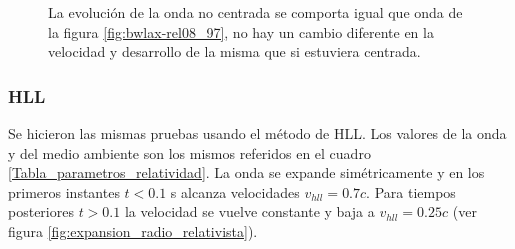 \documentclass[12pt,a4paper]{book}
\begin{document}
\begin{figure}
\caption{\label{fig:bwlaxnc-rel00_65}La evolución de la onda no centrada se comporta igual que onda de la figura \ref{fig:bwlax-rel08_97}, no hay un cambio diferente en la velocidad y desarrollo de la misma que si estuviera centrada.} 
\end{figure}



\subsubsection{HLL}


Se hicieron las mismas pruebas usando el método de HLL. Los valores de la onda y del medio ambiente son los mismos referidos en el cuadro \ref{Tabla_parametros_relatividad}. La onda se expande simétricamente y en los primeros instantes $t < 0.1$ s alcanza velocidades $v_{hll} = 0.7c$. Para tiempos posteriores $t > 0.1$ la velocidad se vuelve constante y baja a $v_{hll} = 0.25c$ (ver figura \ref{fig:expansion_radio_relativista}).%
\end{document}

